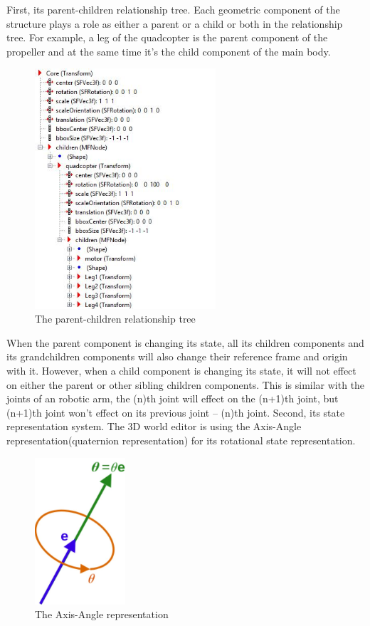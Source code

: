 \newline
\newline
First, its parent-children relationship tree. Each geometric component of the structure plays a role as either a parent or a child or both in the relationship tree. For example, a leg of the quadcopter is the parent component of the propeller and at the same time it’s the child component of the main body.
\begin{figure}[h]
\centering
\includegraphics[width=0.6\textwidth]{./Lin_img/1.JPG}
\caption{The parent-children relationship tree}
\end{figure}
\newline
When the parent component is changing its state, all its children components and its grandchildren components will also change their reference frame and origin with it. However, when a child component is changing its state, it will not effect on either the parent or other sibling children components. This is similar with the joints of an robotic arm, the (n)th joint will effect on the (n+1)th joint, but (n+1)th joint won’t effect on its previous joint -- (n)th joint.
\newline
\newline
Second, its state representation system. The 3D world editor is using the Axis-Angle representation(quaternion representation) for its rotational state representation. 
\begin{figure}[h]
\centering
\includegraphics[width=0.3\textwidth]{./Lin_img/2.JPG}
\caption{The Axis-Angle representation}
\end{figure}
